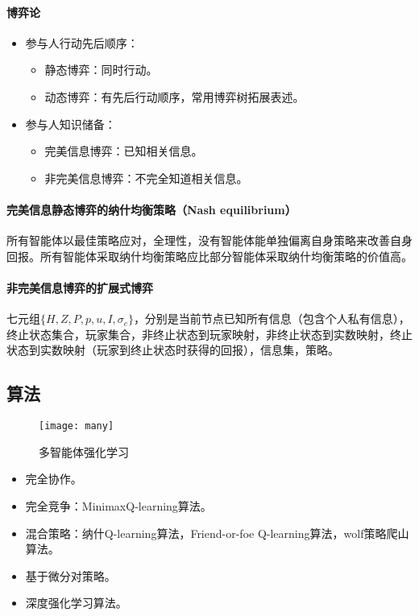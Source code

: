 \documentclass[
12pt, %
a4paper, 
oneside, %
headinclude,footinclude, %
]{scrartcl}
\begin{document}
\paragraph{博弈论}
\begin{itemize}
\item 参与人行动先后顺序：
\begin{itemize}
\item 静态博弈：同时行动。
\item 动态博弈：有先后行动顺序，常用博弈树拓展表述。
\end{itemize}
\item 参与人知识储备：
\begin{itemize}
\item 完美信息博弈：已知相关信息。
\item 非完美信息博弈：不完全知道相关信息。
\end{itemize}
\end{itemize}
\paragraph{完美信息静态博弈的纳什均衡策略（Nash equilibrium）}
所有智能体以最佳策略应对，全理性，没有智能体能单独偏离自身策略来改善自身回报。所有智能体采取纳什均衡策略应比部分智能体采取纳什均衡策略的价值高。
\paragraph{非完美信息博弈的扩展式博弈}
七元组$ \{H, Z, P, p, u, I ,\sigma_c\} $，分别是当前节点已知所有信息（包含个人私有信息），终止状态集合，玩家集合，非终止状态到玩家映射，非终止状态到实数映射，终止状态到实数映射（玩家到终止状态时获得的回报），信息集，策略。
\subsection[算法]{算法}
\begin{figure}[H]
\centering
\texttt{[image: many]}
\caption[多智能体强化学习]{多智能体强化学习}
\end{figure}

\begin{itemize}
\item 完全协作。
\item 完全竞争：MinimaxQ-learning算法。
\item 混合策略：纳什Q-learning算法，Friend-or-foe Q-learning算法，wolf策略爬山算法。
\item 基于微分对策略。
\item 深度强化学习算法。
\end{itemize}
\end{document}
